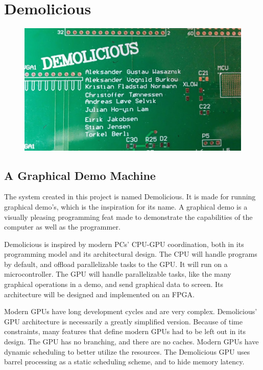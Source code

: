\documentclass[../main/report.tex]{subfiles}
\begin{document}
\chapter{Demolicious}
\label{sec:demolicious}



\begin{figure}[htp]
\centering
\includegraphics[scale=0.24]{assets/PCP_logo.jpg}
\end{figure}

\section{A Graphical Demo Machine}

The system created in this project is named Demolicious.
It is made for running graphical demo's, which is the inspiration for its name.
A graphical demo is a visually pleasing programming feat made to demonstrate the capabilities of the computer as well as the programmer.

Demolicious is inspired by modern PCs' CPU-GPU coordination, both in its programming model and its architectural design.
The CPU will handle programs by default, and offload parallelizable tasks to the GPU.
It will run on a microcontroller.
The GPU will handle parallelizable tasks, like the many graphical operations in a demo, and send graphical data to screen.
Its architecture will be designed and implemented on an FPGA.

Modern GPUs have long development cycles and are very complex.
Demolicious' GPU architecture is necessarily a greatly simplified version.
Because of time constraints, many features that define modern GPUs had to be left out in its design.
The GPU has no branching, and there are no caches.
Modern GPUs have dynamic scheduling to better utilize the resources.
The Demolicious GPU uses barrel processing as a static scheduling scheme, and to hide memory latency.
\end{document}
